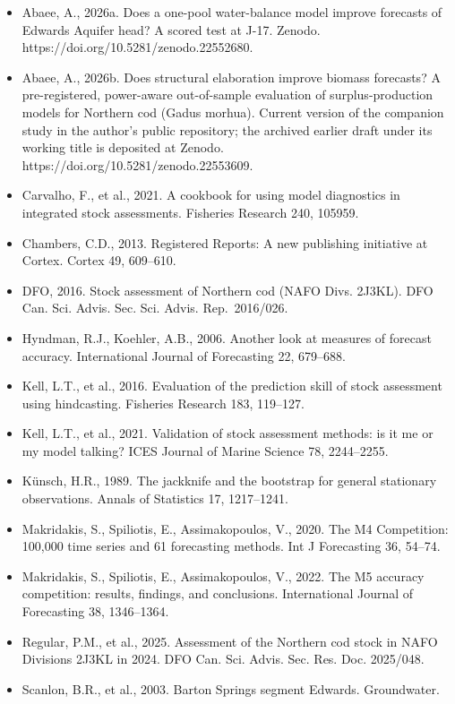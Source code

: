 \documentclass[11pt]{article}
\begin{document}
\begin{itemize}
\item
  Abaee, A., 2026a. Does a one-pool water-balance model improve
  forecasts of Edwards Aquifer head? A scored test at J-17. Zenodo.
  https://doi.org/10.5281/zenodo.22552680.
\item
  Abaee, A., 2026b. Does structural elaboration improve biomass
  forecasts? A pre-registered, power-aware out-of-sample evaluation of
  surplus-production models for Northern cod (Gadus morhua). Current
  version of the companion study in the author's public repository; the
  archived earlier draft under its working title is deposited at Zenodo.
  https://doi.org/10.5281/zenodo.22553609.
\item
  Carvalho, F., et al., 2021. A cookbook for using model diagnostics in
  integrated stock assessments. Fisheries Research 240, 105959.
\item
  Chambers, C.D., 2013. Registered Reports: A new publishing initiative
  at Cortex. Cortex 49, 609--610.
\item
  DFO, 2016. Stock assessment of Northern cod (NAFO Divs. 2J3KL). DFO
  Can. Sci. Advis. Sec. Sci. Advis. Rep.~2016/026.
\item
  Hyndman, R.J., Koehler, A.B., 2006. Another look at measures of
  forecast accuracy. International Journal of Forecasting 22, 679--688.
\item
  Kell, L.T., et al., 2016. Evaluation of the prediction skill of stock
  assessment using hindcasting. Fisheries Research 183, 119--127.
\item
  Kell, L.T., et al., 2021. Validation of stock assessment methods: is
  it me or my model talking? ICES Journal of Marine Science 78,
  2244--2255.
\item
  Künsch, H.R., 1989. The jackknife and the bootstrap for general
  stationary observations. Annals of Statistics 17, 1217--1241.
\item
  Makridakis, S., Spiliotis, E., Assimakopoulos, V., 2020. The M4
  Competition: 100,000 time series and 61 forecasting methods. Int J
  Forecasting 36, 54--74.
\item
  Makridakis, S., Spiliotis, E., Assimakopoulos, V., 2022. The M5
  accuracy competition: results, findings, and conclusions.
  International Journal of Forecasting 38, 1346--1364.
\item
  Regular, P.M., et al., 2025. Assessment of the Northern cod stock in
  NAFO Divisions 2J3KL in 2024. DFO Can. Sci. Advis. Sec. Res. Doc.
  2025/048.
\item
  Scanlon, B.R., et al., 2003. Barton Springs segment Edwards.
  Groundwater.
\end{itemize}
\end{document}
